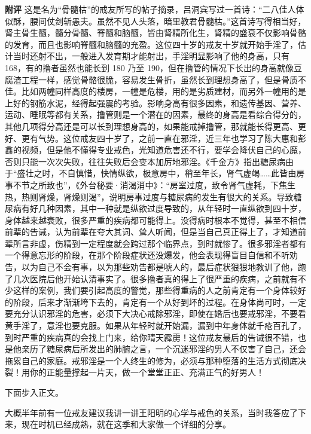 \begin{case}
    \textbf{附评} 这是名为“骨髓枯”的戒友所写的帖子摘录，吕洞宾写过一首诗：“二八佳人体似酥，腰间仗剑斩愚夫。虽然不见人头落，暗里教君骨髓枯。”这首诗写得相当好，肾主骨生髓，髓分骨髓、脊髓和脑髓，皆由肾精所化生，肾精的盛衰不仅影响骨骼的发育，而且也影响脊髓和脑髓的充盈。这位四十岁的戒友十岁就开始手淫了，估计当时还射不出，一般进入发育期才能射出，手淫明显影响了他的身高，只有 168，有的撸者虽然也能长到 180 乃至 190，但在撸管的情况下长出的身高就像豆腐渣工程一样，感觉骨骼很脆，容易发生骨折，虽然长到理想身高了，但是骨质不佳。比如两幢同样高度的楼房，一幢是危楼，用的是劣质建材，而另外一幢用的是上好的钢筋水泥，经得起强震的考验。影响身高有很多因素，和遗传基因、营养、运动、睡眠等都有关系，撸管则是一个潜在的因素，最终的身高是看综合得分的，其他几项得分高还是可以长到理想身高的，如果能戒掉撸管，那就能长得更高、更好、更有气势。这位戒友四十岁了，之前一直在邪淫，近三年也学习了陈大惠和彭鑫的视频，但是他不懂得专业戒色，光知道危害还不行，要学会降伏自己的心魔，否则只能一次次失败，往往失败后会变本加厉地邪淫。《千金方》指出糖尿病由于“盛壮之时，不自慎惜，快情纵欲，极意房中，稍至年长，肾气虚竭……此皆由房事不节之所致也”，《外台秘要·消渴消中》：“房室过度，致令肾气虚耗，下焦生热，热则肾燥，肾燥则渴”，说明房事过度与糖尿病的发生有很大的关系。导致糖尿病有好几种因素，其中一种就是纵欲过度导致的，从年轻时一直纵欲到四十岁，身体越来越衰败，很多严重的疾病都可能得上。没得病时根本不觉得，甚至不相信前辈的告诫，认为前辈在夸大其词、耸人听闻，但是当自己真正得上了，才知道前辈所言非虚，伤精到一定程度就会跨过那个临界点，到时就惨了。很多邪淫者都有一个得意忘形的阶段，在那个阶段症状还没爆发，他会表现得盲目自信和不听劝告，以为自己不会有事，以为那些劝告都是唬人的，最后症状狠狠地教训了他，跑了几次医院后他开始认清事实了。很多撸者真的得上了很严重的疾病，之前就有不少这样的案例，我们要引起高度的警觉，那些得重病的人之前肯定有一个身体较好的阶段，后来才渐渐垮下去的，肯定有一个从好到坏的过程。在身体尚可时，一定要充分认识邪淫的危害，必须下大决心戒除邪淫，即使在婚后也要戒邪淫，不要看黄手淫了，意淫也要克服。如果从年轻时就开始漏，漏到中年身体就千疮百孔了，到时严重的疾病真的会找上门来，给你晴天霹雳！这位戒友最后的告诫很不错，也是他亲历了糖尿病后所发出的肺腑之言，一个沉迷邪淫的男人不仅害了自己，还会拖累自己的家庭。戒邪淫是一个人终生的修为，必须与那种堕落的生活方式彻底决裂！用你的正能量撑起一片天，做一个堂堂正正、充满正气的好男人！
\end{case}

下面步入正文。

大概半年前有一位戒友建议我讲一讲王阳明的心学与戒色的关系，当时我答应了下来，现在时机已经成熟，就在这季和大家做一个详细的分享。

